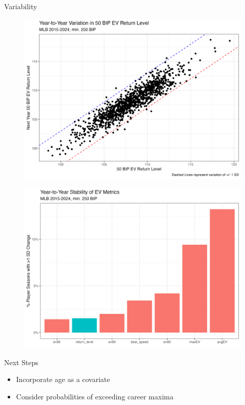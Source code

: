 \documentclass{beamer}
\begin{document}
\begin{frame}[allowframebreaks]{Variability}
    \begin{figure}
        \centering
        \includegraphics[width=0.85\linewidth]{plots/return_level_stability.png}
    \end{figure}
    \begin{figure}
        \centering
        \includegraphics[width=0.85\linewidth]{plots/stability.png}
    \end{figure}
\end{frame}

\begin{frame}{Next Steps}
    \begin{itemize}
        \item Incorporate age as a covariate
        \item Consider probabilities of exceeding career maxima
    \end{itemize}
\end{frame}

\begin{frame}[allowframebreaks]
    \printbibliography
\end{frame}
\end{document}
